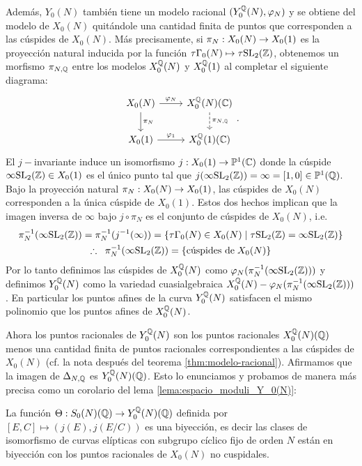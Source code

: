Además, $Y_0(N)$ también tiene un modelo racional $(Y^{\mathbb{Q}}_0(N),\varphi_N)$ y se obtiene del modelo de $X_0(N)$ quitándole una cantidad finita de puntos que corresponden a las cúspides de $X_0(N)$. Más precisamente, si $\pi_N:X_0(N)\rightarrow X_0(1)$ es la proyección natural inducida por la función $\tau\Gamma_0(N)\mapsto\tau\mathrm{SL}_2(\mathbb{Z})$, obtenemos un morfismo $\pi_{N,\mathbb{Q}}$ entre los modelos $X^{\mathbb{Q}}_0(N)$ y $X^{\mathbb{Q}}_0(1)$ al completar el siguiente diagrama:
	\[
		\begin{tikzcd}
			X_0(N) \arrow[d,"\pi_N"] \arrow[r,"\varphi_N"] & X^\QQ_0(N)(\CC) \arrow[d,dashed,"\pi_{N,\QQ}"] \\
			X_0(1) \arrow[r,"\varphi_1"] & X^\QQ_0(1)(\CC)
		\end{tikzcd}.
	\]
El $j-$invariante induce un isomorfismo $j:X_0(1)\rightarrow\mathbb{P}^1(\mathbb{C})$ donde la cúspide $\infty\mathrm{SL}_2(\mathbb{Z})\in X_0(1)$ es el único punto tal que $j(\infty\mathrm{SL}_2(\mathbb{Z}))=\infty=[1,0]\in\mathbb{P}^1(\mathbb{Q})$. Bajo la proyección natural $\pi_N:X_0(N)\rightarrow X_0(1)$, las cúspides de $X_0(N)$ corresponden a la única cúspide de $X_0(1)$. Estos dos hechos implican que la imagen inversa de $\infty$ bajo $j\circ\pi_N$ es el conjunto de cúspides de $X_0(N)$, i.e.
	\begin{gather*}
		\pi_N^{-1}(\infty\mathrm{SL}_2(\mathbb{Z}))=
		\pi_N^{-1}(j^{-1}(\infty))=
		\{\tau\Gamma_0(N)\in X_0(N)\mid \tau\mathrm{SL}_2(\mathbb{Z})=\infty\mathrm{SL}_2(\mathbb{Z})\}\\
		\therefore\;\;\pi_N^{-1}(\infty\mathrm{SL}_2(\mathbb{Z}))= \{\text{cúspides de}\; X_0(N)\}
	\end{gather*}
Por lo tanto definimos las cúspides de $X^{\mathbb{Q}}_0(N)$ como $\varphi_N(\pi_N^{-1}(\infty\mathrm{SL}_2(\mathbb{Z})))$ y definimos $Y^{\mathbb{Q}}_0(N)$ como la variedad cuasialgebraica $X^{\mathbb{Q}}_0(N)-\varphi_N(\pi_N^{-1}(\infty\mathrm{SL}_2(\mathbb{Z})))$. En particular los puntos afines de la curva $Y^{\mathbb{Q}}_0(N)$ satisfacen el mismo polinomio que los puntos afines de $X^{\mathbb{Q}}_0(N)$.

Ahora los puntos racionales de $Y^{\mathbb{Q}}_0(N)$ son los puntos racionales $X^{\mathbb{Q}}_0(N)(\mathbb{Q})$ menos una cantidad finita de puntos racionales correspondientes a las cúspides de $X_0(N)$ (cf. la nota después del teorema \ref{thm:modelo-racional}). Afirmamos que la imagen de $\Delta_{N,\mathbb{Q}} $ es $Y^{\mathbb{Q}}_0(N)(\mathbb{Q})$. Esto lo enunciamos y probamos de manera más precisa como un corolario del lema \ref{lema:espacio_moduli_Y_0(N)}:
 
\begin{cor}\label{cor:clases-curvas-elipticas-puntos-racionales}
	La función $\Theta:S_0(N)(\mathbb{Q})\rightarrow Y^{\mathbb{Q}}_0(N)(\mathbb{Q})$ definida por $[E,C]\mapsto(j(E),j(E/C))$ es una biyección, es decir las clases de isomorfismo de curvas elípticas con subgrupo cíclico fijo de orden $N$ están en biyección con los puntos racionales de $X_0(N)$ no cuspidales.
\end{cor}

